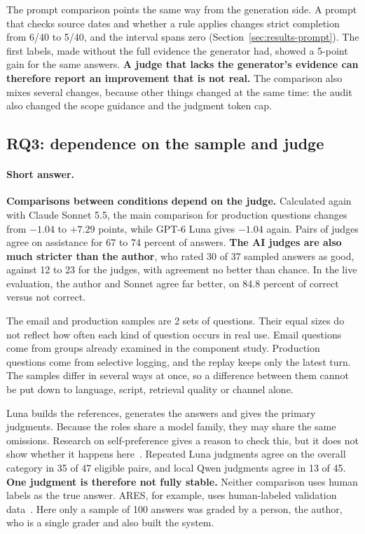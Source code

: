 The prompt comparison points the same way from the generation side. A prompt that checks source dates and whether a rule applies changes strict completion from 6/40 to 5/40, and the interval spans zero (Section~\ref{sec:results-prompt}). The first labels, made without the full evidence the generator had, showed a 5-point gain for the same answers. \textbf{A judge that lacks the generator's evidence can therefore report an improvement that is not real.} The comparison also mixes several changes, because other things changed at the same time: the audit also changed the scope guidance and the judgment token cap.

\subsection{RQ3: dependence on the sample and judge}

\paragraph{Short answer.} \textbf{Comparisons between conditions depend on the judge.} Calculated again with Claude Sonnet 5.5, the main comparison for production questions changes from $-1.04$ to $+7.29$ points, while GPT-6 Luna gives $-1.04$ again. Pairs of judges agree on assistance for 67 to 74 percent of answers. \textbf{The AI judges are also much stricter than the author}, who rated 30 of 37 sampled answers as good, against 12 to 23 for the judges, with agreement no better than chance. In the live evaluation, the author and Sonnet agree far better, on 84.8 percent of correct versus not correct.

The email and production samples are 2 sets of questions. Their equal sizes do not reflect how often each kind of question occurs in real use. Email questions come from groups already examined in the component study. Production questions come from selective logging, and the replay keeps only the latest turn. The samples differ in several ways at once, so a difference between them cannot be put down to language, script, retrieval quality or channel alone.

Luna builds the references, generates the answers and gives the primary judgments. Because the roles share a model family, they may share the same omissions. Research on self-preference gives a reason to check this, but it does not show whether it happens here~\cite{panickssery2024selfpreference,chen2025selfpreference}. Repeated Luna judgments agree on the overall category in 35 of 47 eligible pairs, and local Qwen judgments agree in 13 of 45. \textbf{One judgment is therefore not fully stable.} Neither comparison uses human labels as the true answer. ARES, for example, uses human-labeled validation data~\cite{saadfalcon2024ares}. Here only a sample of 100 answers was graded by a person, the author, who is a single grader and also built the system.

